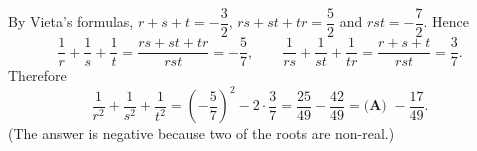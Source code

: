 By Vieta's formulas, $r+s+t=-\dfrac32$, $rs+st+tr=\dfrac52$ and $rst=-\dfrac72$. Hence
\[\dfrac1r+\dfrac1s+\dfrac1t=\dfrac{rs+st+tr}{rst}=-\dfrac57,\qquad\dfrac1{rs}+\dfrac1{st}+\dfrac1{tr}=\dfrac{r+s+t}{rst}=\dfrac37.\]
Therefore
\[\dfrac1{r^2}+\dfrac1{s^2}+\dfrac1{t^2}=\left(-\dfrac57\right)^2-2\cdot\dfrac37=\dfrac{25}{49}-\dfrac{42}{49}=\boxed{\textbf{(A) }-\dfrac{17}{49}}.\]
(The answer is negative because two of the roots are non-real.)

